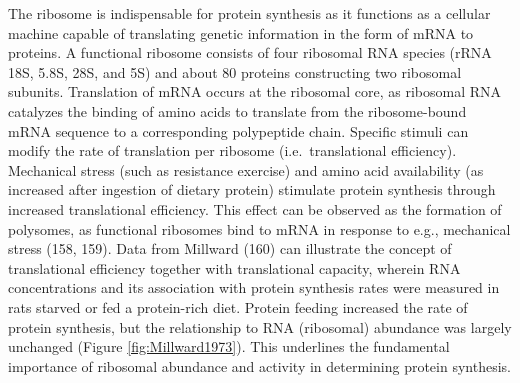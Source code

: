 \documentclass[twoside,10pt]{gihclass} %
\begin{document}
The ribosome is indispensable for protein synthesis as it functions as a cellular machine capable of translating genetic information in the form of mRNA to proteins.
A functional ribosome consists of four ribosomal RNA species (rRNA 18S, 5.8S, 28S, and 5S) and about 80 proteins constructing two ribosomal subunits. Translation of mRNA occurs at the ribosomal core, as ribosomal RNA catalyzes the binding of amino acids to translate from the ribosome-bound mRNA sequence to a corresponding polypeptide chain.
Specific stimuli can modify the rate of translation per ribosome (i.e.~translational efficiency).
Mechanical stress (such as resistance exercise) and amino acid availability (as increased after ingestion of dietary protein) stimulate protein synthesis through increased translational efficiency.
This effect can be observed as the formation of polysomes, as functional ribosomes bind to mRNA in response to e.g., mechanical stress
(158, 159).
Data from Millward (160) can illustrate the concept of translational efficiency together with translational capacity,
wherein RNA concentrations and its association with protein synthesis rates were measured in rats starved or fed a protein-rich diet.
Protein feeding increased the rate of protein synthesis, but the relationship to RNA (ribosomal) abundance was largely unchanged (Figure \ref{fig:Millward1973}). This underlines the fundamental importance of ribosomal abundance and activity in determining protein synthesis.
\end{document}

